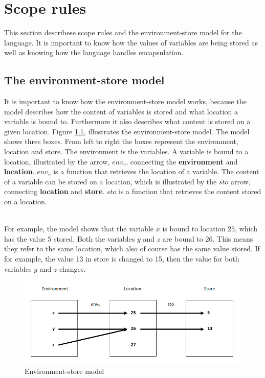 \chapter{Scope rules}\label{chap:scope-rules}
This section describese scope rules and the environment-store model for the language. It is important to know how the values of variables are being stored as well as knowing how the language handles encapsulation. 

\section{The environment-store model}\label{sec:es-model}
It is important to know how the environment-store model works, because the model describes how the content of variables is stored and what location a variable is bound to. Furthermore it also describes what content is stored on a given location. Figure \ref{fig:esmodel}, illustrates the environment-store model. The model shows three boxes. From left to right the boxes represent the environment, location and store. The environment is the variables. A variable is bound to a location, illustrated by the arrow, $env_v$, connecting the \textbf{environment} and \textbf{location}. $env_v$ is a function that retrieves the location of a variable. The content of a variable can be stored on a location, which is illustrated by the $sto$ arrow, connecting \textbf{location} and \textbf{store}. $sto$ is a function that retrieves the content stored on a location. 

\\For example, the model shows that the variable $x$ is bound to location $25$, which has the value $5$ stored. Both the variables $y$ and $z$ are bound to $26$. This means they refer to the same location, which also of course has the same value stored. If for example, the value 13 in store is changed to 15, then the value for both variables $y$ and $z$ changes.
\begin{figure}[H]
\includegraphics{billeder/environment_store_model.png}
\caption{Environment-store model}
\label{fig:esmodel}
\end{figure}


